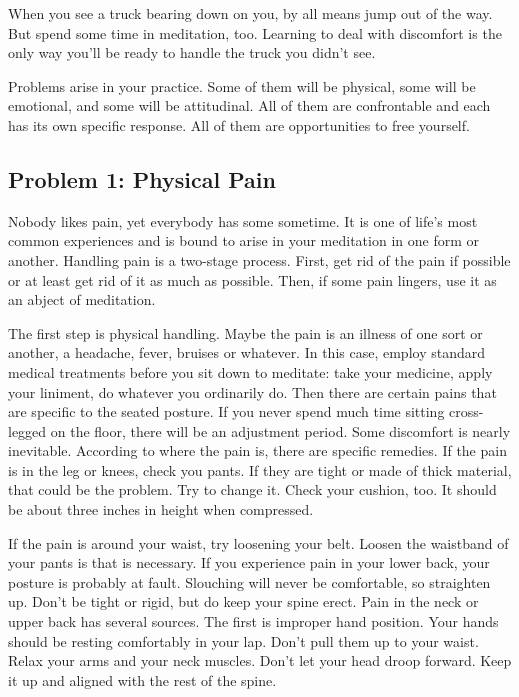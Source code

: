 When you see a truck bearing down on you, by all means jump out of the way. But
spend some time in meditation, too. Learning to deal with discomfort is the only
way you'll be ready to handle the truck you didn't see.

Problems arise in your practice. Some of them will be physical, some will be
emotional, and some will be attitudinal. All of them are confrontable and each
has its own specific response. All of them are opportunities to free yourself.

\subsection{Problem 1: Physical Pain} Nobody likes pain, yet everybody has some sometime. It
is one of life's most common experiences and is bound to arise in your
meditation in one form or another. Handling pain is a two-stage process. First,
get rid of the pain if possible or at least get rid of it as much as possible.
Then, if some pain lingers, use it as an abject of meditation.

The first step is physical handling. Maybe the pain is an illness of one sort or
another, a headache, fever, bruises or whatever. In this case, employ standard
medical treatments before you sit down to meditate: take your medicine, apply
your liniment, do whatever you ordinarily do. Then there are certain pains that
are specific to the seated posture. If you never spend much time sitting
cross-legged on the floor, there will be an adjustment period. Some discomfort
is nearly inevitable. According to where the pain is, there are specific
remedies. If the pain is in the leg or knees, check you pants. If they are tight
or made of thick material, that could be the problem. Try to change it. Check
your cushion, too. It should be about three inches in height when compressed.

If the pain is around your waist, try loosening your belt. Loosen the waistband
of your pants is that is necessary. If you experience pain in your lower back,
your posture is probably at fault. Slouching will never be comfortable, so
straighten up. Don't be tight or rigid, but do keep your spine erect. Pain in
the neck or upper back has several sources. The first is improper hand position.
Your hands should be resting comfortably in your lap. Don't pull them up to your
waist. Relax your arms and your neck muscles. Don't let your head droop forward.
Keep it up and aligned with the rest of the spine.

